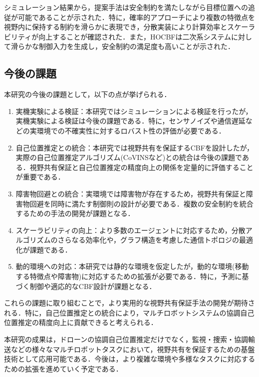 シミュレーション結果から，提案手法は安全制約を満たしながら目標位置への追従が可能であることが示された．特に，確率的アプローチにより複数の特徴点を視野内に保持する制約を滑らかに表現でき，分散実装により計算効率とスケーラビリティが向上することが確認された．また，HOCBFは二次系システムに対して滑らかな制御入力を生成し，安全制約の満足度も高いことが示された．

\subsection{今後の課題}

本研究の今後の課題として，以下の点が挙げられる．

\begin{enumerate}
    \item 実機実験による検証：本研究ではシミュレーションによる検証を行ったが，実機実験による検証は今後の課題である．特に，センサノイズや通信遅延などの実環境での不確実性に対するロバスト性の評価が必要である．
    
    \item 自己位置推定との統合：本研究では視野共有を保証するCBFを設計したが，実際の自己位置推定アルゴリズム(CoVINSなど)との統合は今後の課題である．視野共有保証と自己位置推定の精度向上の関係を定量的に評価することが重要である．
    
    \item 障害物回避との統合：実環境では障害物が存在するため，視野共有保証と障害物回避を同時に満たす制御則の設計が必要である．複数の安全制約を統合するための手法の開発が課題となる．
    
    \item スケーラビリティの向上：より多数のエージェントに対応するため，分散アルゴリズムのさらなる効率化や，グラフ構造を考慮した通信トポロジの最適化が課題である．
    
    \item 動的環境への対応：本研究では静的な環境を仮定したが，動的な環境(移動する特徴点や障害物)に対応するための拡張が必要である．特に，予測に基づく制御や適応的なCBF設計が課題となる．
\end{enumerate}

これらの課題に取り組むことで，より実用的な視野共有保証手法の開発が期待される．特に，自己位置推定との統合により，マルチロボットシステムの協調自己位置推定の精度向上に貢献できると考えられる．

本研究の成果は，ドローンの協調自己位置推定だけでなく，監視・捜索・協調輸送などの様々なマルチロボットタスクにおいて，視野共有を保証するための基盤技術として応用可能である．今後は，より複雑な環境や多様なタスクに対応するための拡張を進めていく予定である．
